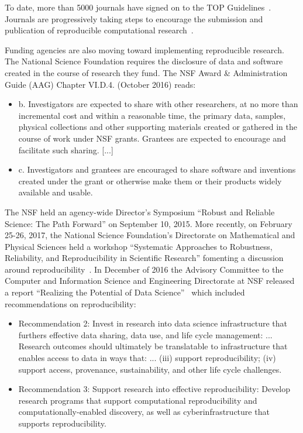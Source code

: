 \documentclass{elsarticle}
\begin{document}
To date, more than 5000 journals have signed on to the TOP Guidelines~\cite{nosek1422,victoria07}. 
Journals are progressively taking steps to encourage the submission and publication of reproducible computational research~\cite{victoria10}. 

Funding agencies are also moving toward implementing reproducible research. The National Science Foundation requires the disclosure of data and software created in the course of research they fund. The NSF Award \& Administration Guide (AAG) Chapter VI.D.4. (October 2016) reads:

\begin{itemize}
\item b.	Investigators are expected to share with other researchers, at no more than incremental cost and within a reasonable time, the primary data, samples, physical collections and other supporting materials created or gathered in the course of work under NSF grants. Grantees are expected to encourage and facilitate such sharing. [...]

\item c.	Investigators and grantees are encouraged to share software and inventions created under the grant or otherwise make them or their products widely available and usable.

\end{itemize}

The NSF held an agency-wide Director's Symposium ``Robust and Reliable Science: The Path Forward'' on September 10, 2015. More recently, on February 25-26, 2017, the National Science Foundation's Directorate on Mathematical and Physical Sciences held a workshop ``Systematic Approaches to Robustness, Reliability, and Reproducibility in Scientific Research'' fomenting a discussion around reproducibility~\cite{victoria11}. In December of 2016 the Advisory Committee to the Computer and Information Science and Engineering Directorate at NSF released a report ``Realizing the Potential of Data Science''~\cite{victoria12} which included recommendations on reproducibility:

\begin{itemize}
\item Recommendation 2: Invest in research into data science infrastructure that furthers effective data sharing, data use, and life cycle management: ... Research outcomes should ultimately be translatable to infrastructure that enables access to data in ways that: ... (iii) support reproducibility; (iv) support access, provenance, sustainability, and other life cycle challenges.
\item Recommendation 3: Support research into effective reproducibility: Develop research programs that support computational reproducibility and computationally-enabled discovery, as well as cyberinfrastructure that supports reproducibility.
\end{itemize}
\end{document}

